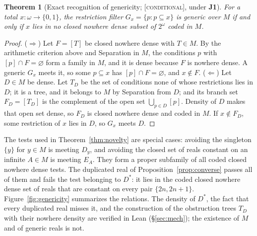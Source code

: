 \documentclass[11pt]{article}
\newcommand{\gradetag}[1]{\textnormal{\textsc{[#1]}}}
\newcommand{\condg}{\gradetag{conditional}}
\newtheorem{theorem}{Theorem}[section]
\theoremstyle{definition}
\begin{document}
\begin{theorem}[Exact recognition of genericity; \condg, under \textbf{J1}]\label{thm:recognition}
For a total $x\colon\omega\to\{0,1\}$, the restriction filter $G_x=\{p:p\subseteq x\}$ is generic
over $M$ if and only if $x$ lies in no closed nowhere dense subset of $2^\omega$ coded in $M$.
\end{theorem}

\begin{proof}
($\Rightarrow$) Let $F=[T]$ be closed nowhere dense with $T\in M$. By the arithmetic criterion
above and Separation in $M$, the conditions $p$ with $[p]\cap F=\varnothing$ form a family in $M$,
and it is dense because $F$ is nowhere dense. A
generic $G_x$ meets it, so some $p\subseteq x$ has $[p]\cap F=\varnothing$, and $x\notin F$.
($\Leftarrow$) Let $D\in M$ be dense. Let $T_D$ be the set of conditions none of whose restrictions
lies in $D$; it is a tree, and it belongs to $M$ by Separation from $D$; and its branch set $F_D=[T_D]$ is the complement of the open set
$\bigcup_{p\in D}[p]$. Density of $D$ makes that open set dense, so $F_D$ is closed nowhere dense
and coded in $M$. If $x\notin F_D$, some restriction of $x$ lies in $D$, so $G_x$ meets $D$.
\end{proof}

The tests used in Theorem~\ref{thm:novelty} are special cases: avoiding the singleton $\{y\}$ for
$y\in M$ is meeting $D_y$, and avoiding the closed set of reals constant on an infinite $A\in M$ is
meeting $E_A$. They form a proper subfamily of all coded closed nowhere dense tests. The
duplicated real of Proposition~\ref{prop:converse} passes all of them and fails the test
belonging to $D^\ast$: it lies in the coded closed nowhere dense set of reals that are constant on
every pair $\{2n,2n+1\}$. Figure~\ref{fig:genericity} summarizes the relations. The density of
$D^\ast$, the fact that every duplicated real misses it, and the construction of the obstruction
trees $T_D$ with their nowhere density are verified in Lean (\S\ref{sec:mech}); the existence of $M$
and of generic reals is not.
\end{document}
